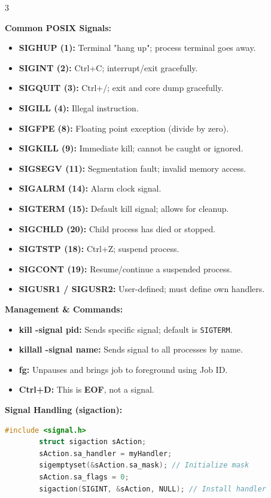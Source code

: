 \documentclass[10pt,landscape]{article}
\begin{document}
\begin{multicols*}{3}
{        \textbf{Common POSIX Signals:}
        \begin{itemize}
            \item \textbf{SIGHUP (1):} Terminal "hang up"; process terminal goes away.
            \item \textbf{SIGINT (2):} Ctrl+C; interrupt/exit gracefully.
            \item \textbf{SIGQUIT (3):} Ctrl+/; exit and core dump gracefully.
            \item \textbf{SIGILL (4):} Illegal instruction.
            \item \textbf{SIGFPE (8):} Floating point exception (divide by zero).
            \item \textbf{SIGKILL (9):} Immediate kill; cannot be caught or ignored.
            \item \textbf{SIGSEGV (11):} Segmentation fault; invalid memory access.
            \item \textbf{SIGALRM (14):} Alarm clock signal.
            \item \textbf{SIGTERM (15):} Default kill signal; allows for cleanup.
            \item \textbf{SIGCHLD (20):} Child process has died or stopped.
            \item \textbf{SIGTSTP (18):} Ctrl+Z; suspend process.
            \item \textbf{SIGCONT (19):} Resume/continue a suspended process.
            \item \textbf{SIGUSR1 / SIGUSR2:} User-defined; must define own handlers.
        \end{itemize}

        \textbf{Management \& Commands:}
        \begin{itemize}
            \item \textbf{kill -signal pid:} Sends specific signal; default is \texttt{SIGTERM}.
            \item \textbf{killall -signal name:} Sends signal to all processes by name.
            \item \textbf{fg:} Unpauses and brings job to foreground using Job ID.
            \item \textbf{Ctrl+D:} This is \textbf{EOF}, not a signal.
        \end{itemize}

        \textbf{Signal Handling (sigaction):}
        \begin{lstlisting}[language=C]
        #include <signal.h>
        struct sigaction sAction;
        sAction.sa_handler = myHandler; 
        sigemptyset(&sAction.sa_mask); // Initialize mask
        sAction.sa_flags = 0;
        sigaction(SIGINT, &sAction, NULL); // Install handler
        \end{lstlisting}

}
\end{multicols*}
\end{document}
